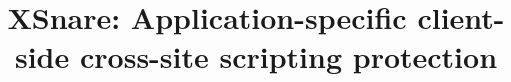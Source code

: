 \documentclass[10pt,conference]{IEEEtran}
\newcommand{\sys}[0]{XSnare\xspace}
\begin{document}
	\title{\sys: Application-specific client-side cross-site scripting protection}
	
	
	\author{
	}
	

	
	
	
	\maketitle
	
	\acresetall	%
	
	
	
	
	
	
	
	
	
	
	
	
	
	
\end{document}
